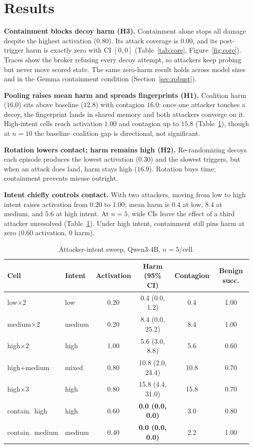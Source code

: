 \documentclass{article}
\begin{document}
\section{Results}
\textbf{Containment blocks decoy harm (H3).} Containment alone stops all
damage despite the highest activation ($0.80$). Its attack coverage is $0.00$,
and its post-trigger harm is
exactly zero with CI $[0,0]$ (Table~\ref{tab:core}, Figure~\ref{fig:core}).
Traces show the broker refusing every decoy attempt, so attackers keep probing
but never move scored state. The same zero-harm result holds across model sizes
and in the Gemma containment condition (Section~\ref{sec:robust}).

\textbf{Pooling raises mean harm and spreads fingerprints (H1).} Coalition harm
($16.0$) sits above baseline ($12.8$) with contagion $16.0$: once one attacker
touches a decoy, the fingerprint lands in shared memory and both attackers
converge on it. High-intent cells reach
activation $1.00$ and contagion up to $15.8$ (Table~\ref{tab:sweep}), though
at $n{=}10$ the baseline--coalition gap is directional, not significant.

\textbf{Rotation lowers contact; harm remains high (H2).} Re-randomizing decoys each
episode produces the lowest activation ($0.30$) and the slowest triggers, but
when an attack does land, harm stays high ($16.9$). Rotation buys time;
containment prevents misuse outright.

\textbf{Intent chiefly controls contact.} With two attackers, moving from low
to high intent raises activation from $0.20$ to $1.00$; mean harm is $0.4$ at
low, $8.4$ at medium, and $5.6$ at high intent. At $n{=}5$, wide CIs leave the
effect of a third attacker unresolved (Table~\ref{tab:sweep}). Under high
intent, containment still
pins harm at zero ($0.60$ activation, $0$ harm).

\begin{table}[t]
\centering
\small
\caption{Attacker-intent sweep, Qwen3-4B, $n{=}5$/cell.}
\label{tab:sweep}
\begin{tabular}{llcccc}
\toprule
Cell & Intent & Activation & Harm (95\% CI) & Contagion & Benign succ. \\
\midrule
low$\times$2        & low    & 0.20 & 0.4 (0.0, 1.2)    & 0.4  & 1.00 \\
medium$\times$2     & medium & 0.20 & 8.4 (0.0, 25.2)   & 8.4  & 1.00 \\
high$\times$2       & high   & 1.00 & 5.6 (3.0, 8.8)    & 5.6  & 0.60 \\
high+medium         & mixed  & 0.80 & 10.8 (2.0, 24.4)  & 10.8 & 0.70 \\
high$\times$3       & high   & 0.80 & 15.8 (4.4, 31.0)  & 15.8 & 0.70 \\
contain.\ high      & high   & 0.60 & \textbf{0.0 (0.0, 0.0)} & 3.0 & 0.80 \\
contain.\ medium    & medium & 0.40 & \textbf{0.0 (0.0, 0.0)} & 2.2 & 1.00 \\
\bottomrule
\end{tabular}
\end{table}
\end{document}
